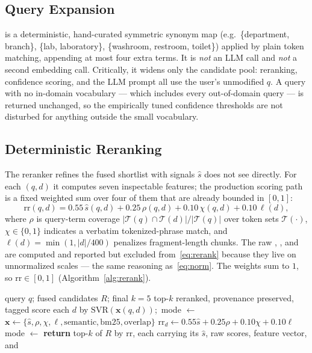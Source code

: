 \subsection{Query Expansion}
 is a deterministic, hand-curated symmetric synonym map
(e.g.\ \{department, branch\}, \{lab, laboratory\}, \{washroom, restroom,
toilet\}) applied by plain token matching, appending at most four extra
terms. It is \emph{not} an LLM call and \emph{not} a second embedding call.
Critically, it widens only the candidate pool: reranking, confidence
scoring, and the LLM prompt all use the user's unmodified $q$. A query with
no in-domain vocabulary --- which includes every out-of-domain query --- is
returned unchanged, so the empirically tuned confidence thresholds are not
disturbed for anything outside the small vocabulary.

\subsection{Deterministic Reranking}
The reranker refines the fused shortlist with signals $\hat s$ does not see
directly. For each $(q,d)$ it computes seven inspectable features; the
production scoring path is a fixed weighted sum over four of them that are
already bounded in $[0,1]$:
\begin{equation}
\mathrm{rr}(q,d) = 0.55\,\hat s(q,d)
+ 0.25\,\rho(q,d)
+ 0.10\,\chi(q,d)
+ 0.10\,\ell(d),
\label{eq:rerank}
\end{equation}
where $\rho$ is query-term coverage $|\mathcal{T}(q)\cap\mathcal{T}(d)| /
|\mathcal{T}(q)|$ over token sets $\mathcal{T}(\cdot)$, $\chi\in\{0,1\}$
indicates a verbatim tokenized-phrase match, and
$\ell(d) = \min(1, |d|/400)$ penalizes fragment-length chunks. The raw
, , and  are
computed and reported but excluded from~\eqref{eq:rerank} because they live
on unnormalized scales --- the same reasoning as~\eqref{eq:norm}. The
weights sum to $1$, so $\mathrm{rr}\in[0,1]$
(Algorithm~\ref{alg:rerank}).

\begin{algorithm}[!t]
\caption{Heuristic Context Reranking}
\label{alg:rerank}
\begin{algorithmic}[1]
\Require query $q$; fused candidates $R$; final $k{=}5$
\Ensure top-$k$ reranked, provenance preserved, tagged 
  \State score each $d$ by $\mathrm{SVR}(\mathbf{x}(q,d))$;\ mode $\gets$ 
\Else {}
     \State $\mathbf{x} \gets \{\hat s, \rho, \chi, \ell, \text{semantic}, \text{bm25}, \text{overlap}\}$
     \State $\mathrm{rr}_d \gets 0.55\hat s + 0.25\rho + 0.10\chi + 0.10\ell$ 
  \EndFor
  \State mode $\gets$ 
\EndIf
\State \textbf{return} top-$k$ of $R$ by $\mathrm{rr}$, each carrying its
$\hat s$, raw scores, feature vector, and 
\end{algorithmic}
\end{algorithm}


